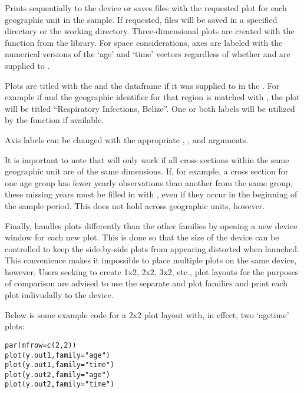 \begin{Details}\relax
Prints sequentially to the device or saves  files
with the requested plot for each geographic unit in the sample. If
requested,  files will be saved in a specified directory or
the working directory. Three-dimensional plots are created with the
 function from the  library.  For space
considerations, axes are labeled with the numerical versions of the
`age' and `time' vectors regardless of whether
 and  are supplied to
.

Plots are titled with the  and the 
dataframe if it was supplied to  in the
.  For example if  and the geographic identifier for that region is matched
with , the plot will be titled ``Respiratory Infections,
Belize''. One or both labels will be utilized by the function if available.

Axis labels can be changed with the appropriate ,
, and  arguments.

It is important to note that  will only work if
all cross sections within the same geographic unit are of the same
dimensions. If, for example, a cross section for one age group has
fewer yearly observations than another from the same group, these
missing years must be filled in with , even if they occur in
the beginning of the sample period. This does not hold across
geographic units, however.

Finally,  handles  plots differently
than the other families by opening a new device window for each new
plot. This is done so that the size of the device can be controlled to
keep the side-by-side plots from appearing distorted when launched. This
convenience makes it impossible to place multiple plots on the same
device, however. Users seeking to create 1x2, 2x2, 3x2, etc., plot
layouts for the purposes of comparison are advised to use the separate
 and  plot families and print each plot indivudally
to the device.

Below is some example code for a 2x2 plot layout with, in effect, two
`agetime' plots:
\begin{alltt}
  par(mfrow=c(2,2))
  plot(y.out1,family="age")
  plot(y.out1,family="time")
  plot(y.out2,family="age")
  plot(y.out2,family="time")
\end{alltt}

\end{Details}
